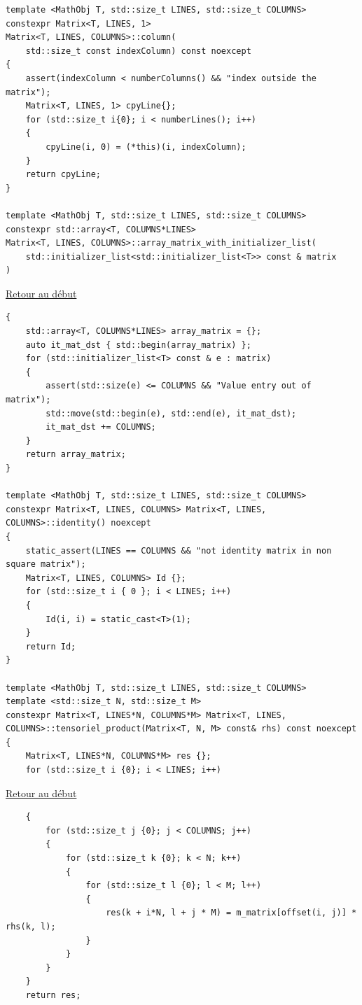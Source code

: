 {\begin{frame}[fragile]
\begin{verbatim}
template <MathObj T, std::size_t LINES, std::size_t COLUMNS>
constexpr Matrix<T, LINES, 1>
Matrix<T, LINES, COLUMNS>::column(
	std::size_t const indexColumn) const noexcept
{
	assert(indexColumn < numberColumns() && "index outside the matrix");
	Matrix<T, LINES, 1> cpyLine{};
	for (std::size_t i{0}; i < numberLines(); i++)
	{
		cpyLine(i, 0) = (*this)(i, indexColumn);
	}
	return cpyLine;
}

template <MathObj T, std::size_t LINES, std::size_t COLUMNS>
constexpr std::array<T, COLUMNS*LINES>
Matrix<T, LINES, COLUMNS>::array_matrix_with_initializer_list(
	std::initializer_list<std::initializer_list<T>> const & matrix
)
\end{verbatim}
\end{frame}

\begin{frame}[fragile]
\hyperlink{conclusion}{Retour au début}\newline
\begin{verbatim}
{
	std::array<T, COLUMNS*LINES> array_matrix = {};
	auto it_mat_dst { std::begin(array_matrix) };
	for (std::initializer_list<T> const & e : matrix)
	{
		assert(std::size(e) <= COLUMNS && "Value entry out of matrix");
		std::move(std::begin(e), std::end(e), it_mat_dst);
		it_mat_dst += COLUMNS;
	}
	return array_matrix;
}

template <MathObj T, std::size_t LINES, std::size_t COLUMNS>
constexpr Matrix<T, LINES, COLUMNS> Matrix<T, LINES, COLUMNS>::identity() noexcept
{
	static_assert(LINES == COLUMNS && "not identity matrix in non square matrix");
	Matrix<T, LINES, COLUMNS> Id {};
	for (std::size_t i { 0 }; i < LINES; i++)
	{
		Id(i, i) = static_cast<T>(1);
	}
	return Id;
}

template <MathObj T, std::size_t LINES, std::size_t COLUMNS>
template <std::size_t N, std::size_t M>
constexpr Matrix<T, LINES*N, COLUMNS*M> Matrix<T, LINES, COLUMNS>::tensoriel_product(Matrix<T, N, M> const& rhs) const noexcept
{
	Matrix<T, LINES*N, COLUMNS*M> res {};
	for (std::size_t i {0}; i < LINES; i++)
\end{verbatim}
\end{frame}

\begin{frame}[fragile]
\hyperlink{conclusion}{Retour au début}\newline
\begin{verbatim}
	{
		for (std::size_t j {0}; j < COLUMNS; j++)
		{
			for (std::size_t k {0}; k < N; k++)
			{
				for (std::size_t l {0}; l < M; l++)
				{
					res(k + i*N, l + j * M) = m_matrix[offset(i, j)] * rhs(k, l);
				}
			}
		}
	}
	return res;


\end{verbatim}
\end{frame}}
